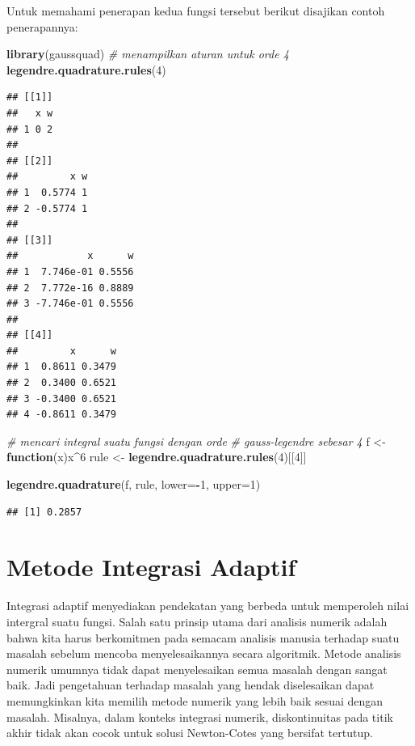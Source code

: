\documentclass[
]{book}
\newenvironment{Shaded}{\begin{snugshade}}{\end{snugshade}}
\newcommand{\AttributeTok}[1]{\textcolor[rgb]{0.13,0.29,0.53}{#1}}
\newcommand{\CommentTok}[1]{\textcolor[rgb]{0.56,0.35,0.01}{\textit{#1}}}
\newcommand{\ControlFlowTok}[1]{\textcolor[rgb]{0.13,0.29,0.53}{\textbf{#1}}}
\newcommand{\DecValTok}[1]{\textcolor[rgb]{0.00,0.00,0.81}{#1}}
\newcommand{\FunctionTok}[1]{\textcolor[rgb]{0.13,0.29,0.53}{\textbf{#1}}}
\newcommand{\NormalTok}[1]{#1}
\newcommand{\OtherTok}[1]{\textcolor[rgb]{0.56,0.35,0.01}{#1}}
\newcommand{\SpecialCharTok}[1]{\textcolor[rgb]{0.81,0.36,0.00}{\textbf{#1}}}
\theoremstyle{definition}
\theoremstyle{definition}
\theoremstyle{definition}
\theoremstyle{definition}
\theoremstyle{remark}
\begin{document}
Untuk memahami penerapan kedua fungsi tersebut berikut disajikan contoh penerapannya:

\begin{Shaded}
\begin{Highlighting}[]
\FunctionTok{library}\NormalTok{(gaussquad)}
\CommentTok{\# menampilkan aturan untuk orde 4}
\FunctionTok{legendre.quadrature.rules}\NormalTok{(}\DecValTok{4}\NormalTok{)}
\end{Highlighting}
\end{Shaded}

\begin{verbatim}
## [[1]]
##   x w
## 1 0 2
## 
## [[2]]
##         x w
## 1  0.5774 1
## 2 -0.5774 1
## 
## [[3]]
##            x      w
## 1  7.746e-01 0.5556
## 2  7.772e-16 0.8889
## 3 -7.746e-01 0.5556
## 
## [[4]]
##         x      w
## 1  0.8611 0.3479
## 2  0.3400 0.6521
## 3 -0.3400 0.6521
## 4 -0.8611 0.3479
\end{verbatim}

\begin{Shaded}
\begin{Highlighting}[]
\CommentTok{\# mencari integral suatu fungsi dengan orde}
\CommentTok{\# gauss{-}legendre sebesar 4}
\NormalTok{f }\OtherTok{\textless{}{-}} \ControlFlowTok{function}\NormalTok{(x)x}\SpecialCharTok{\^{}}\DecValTok{6}
\NormalTok{rule }\OtherTok{\textless{}{-}} \FunctionTok{legendre.quadrature.rules}\NormalTok{(}\DecValTok{4}\NormalTok{)[[}\DecValTok{4}\NormalTok{]]}

\FunctionTok{legendre.quadrature}\NormalTok{(f, rule, }\AttributeTok{lower=}\SpecialCharTok{{-}}\DecValTok{1}\NormalTok{, }\AttributeTok{upper=}\DecValTok{1}\NormalTok{)}
\end{Highlighting}
\end{Shaded}

\begin{verbatim}
## [1] 0.2857
\end{verbatim}

\hypertarget{adaptifint}{%
\section{Metode Integrasi Adaptif}\label{adaptifint}}

Integrasi adaptif menyediakan pendekatan yang berbeda untuk memperoleh nilai intergral suatu fungsi. Salah satu prinsip utama dari analisis numerik adalah bahwa kita harus berkomitmen pada semacam analisis manusia terhadap suatu masalah sebelum mencoba menyelesaikannya secara algoritmik. Metode analisis numerik umumnya tidak dapat menyelesaikan semua masalah dengan sangat baik. Jadi pengetahuan terhadap masalah yang hendak diselesaikan dapat memungkinkan kita memilih metode numerik yang lebih baik sesuai dengan masalah. Misalnya, dalam konteks integrasi numerik, diskontinuitas pada titik akhir tidak akan cocok untuk solusi Newton-Cotes yang bersifat tertutup.
\end{document}
